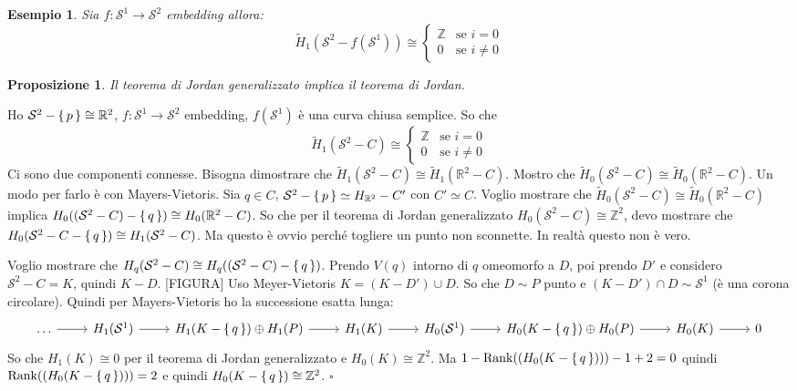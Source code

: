 \documentclass[10pt, twoside=false, x11names]{scrbook}
\newtheorem{proposition}[theorem]{Proposizione}
\newtheorem{example}[theorem]{Esempio}
\newenvironment{proof}{{\textbf{Dimostrazione}:}}{\hfill $\square$}
\newcommand{\Z}{\mathbb{Z}}
\newcommand{\rank}[1]{\mathrm{Rank}( #1 )}
\newcommand{\RN}[1][]{\mathbb{R}^#1}
\newcommand{\Sph}[1][]{\mathcal{S}^#1}
\let\setminus-
\begin{document}
\begin{example}
  Sia $ f \colon \Sph{1} \to \Sph{2} $ embedding allora:
  \[
    \tilde{H}_1(\Sph{2} \setminus f(\Sph{1})) \cong
    \begin{cases}
      \Z & \text{se } i = 0 \\
      0 & \text{se } i \not = 0
    \end{cases}
  \]
\end{example}

\begin{proposition}
  Il teorema di Jordan generalizzato implica il teorema di Jordan.
\end{proposition}
\begin{proof}
  Ho $ \Sph{2} \setminus \set{p} \cong \RN{2} $, $ f \colon \Sph{1} \to \Sph{2} $ embedding,
  $ f(\Sph{1}) $ è una curva chiusa semplice. So che
  \[
    \tilde{H}_1(\Sph{2} \setminus C ) \cong
    \begin{cases}
      \Z & \text{se } i = 0 \\
      0 & \text{se } i \not = 0
    \end{cases}
  \]
  Ci sono due componenti connesse. Bisogna dimostrare che
  $ \tilde{H}_1(\Sph{2} \setminus C) \cong \tilde{H}_1(\RN{2} \setminus C) $. Mostro che
  $ \tilde{H}_0(\Sph{2} \setminus C) \cong \tilde{H}_0(\RN{2} \setminus C) $. Un modo per farlo è
  con Mayers-Vietoris. Sia $ q \in C $,
  $ \Sph{2} \setminus \set{p} \simeq H_{\RN{2}} \setminus C' $ con $ C' \simeq C $.
  Voglio mostrare che  $ \tilde{H}_0(\Sph{2} \setminus C) \cong \tilde{H}_0(\RN{2} \setminus C) $
  implica $ H_0((\Sph{2} \setminus C) \setminus \set{q}) \cong H_0(\RN{2} \setminus C) $.
  So che per il teorema di Jordan generalizzato $ H_0(\Sph{2} \setminus C) \cong \Z^2 $,
  devo mostrare che $ H_0(\Sph{2} \setminus C \setminus \set{q}) \cong H_1(\Sph{2} \setminus C) $.
  Ma questo è ovvio perché togliere un punto non sconnette. In realtà questo non
  è vero.

  Voglio mostrare che $ H_q(\Sph{2} \setminus C) \cong H_q((\Sph{2} \setminus C) \setminus \set{q}) $.
  Prendo $ V(q) $ intorno di $ q $ omeomorfo a $ D $, poi prendo $ D' $
  e considero $ \Sph{2} \setminus C = K $, quindi $ K \setminus D $.
  [FIGURA]
  Uso Meyer-Vietoris $ K = (K \setminus D') \cup D $. So che $ D \sim P $ punto e
  $ (K \setminus D') \cap D \sim \Sph{1} $ (è una corona circolare). Quindi per
  Mayers-Vietoris ho la successione esatta lunga:
  \[
    \begin{tikzcd}
      \dots \rar & H_1(\Sph{1}) \rar & H_1(K \setminus \set{q}) \oplus H_1(P) \rar & H_1(K) \rar & H_0(\Sph{1}) \rar & H_0(K \setminus \set{q})
      \oplus H_0(P) \rar & H_0(K) \rar & 0
    \end{tikzcd}
  \]
  So che $ H_1(K) \cong 0 $ per il teorema di Jordan generalizzato e $ H_0(K) \cong \Z^2 $.
  Ma $ 1 - \rank{(H_0(K \setminus \set{q}))} -1 + 2 = 0 $ quindi $ \rank{(H_0(K \setminus \set{q}))} = 2 $
  e quindi $ H_0(K \setminus \set{q}) \cong \Z^2 $.
\end{proof}
\end{document}
